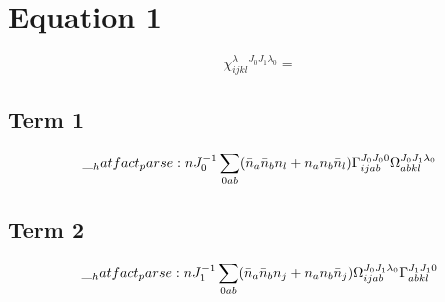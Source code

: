 \documentclass{scrartcl}
\begin{document}
\section{Equation 1}
\begin{dmath*}
\chi^{\lambda}_{i j k l}^{{J}_{0} {J}_{1} {{\lambda}}_{0}} = 
\end{dmath*}
\subsection{Term 1}
\begin{dmath*}
\hatfact{{J}_{0}^{-1}} \* \sum_{0 a b} \* (\bar{n}_{a} \* \bar{n}_{b} \* n_{l} + n_{a} \* n_{b} \* \bar{n}_{l}) \* \Gamma_{i j a b}^{{J}_{0} {J}_{0} 0} \* \Omega_{a b k l}^{{J}_{0} {J}_{1} {{\lambda}}_{0}}
\end{dmath*}
\subsection{Term 2}
\begin{dmath*}
\hatfact{{J}_{1}^{-1}} \* \sum_{0 a b} \* (\bar{n}_{a} \* \bar{n}_{b} \* n_{j} + n_{a} \* n_{b} \* \bar{n}_{j}) \* \Omega_{i j a b}^{{J}_{0} {J}_{1} {{\lambda}}_{0}} \* \Gamma_{a b k l}^{{J}_{1} {J}_{1} 0}
\end{dmath*}
\end{document}
